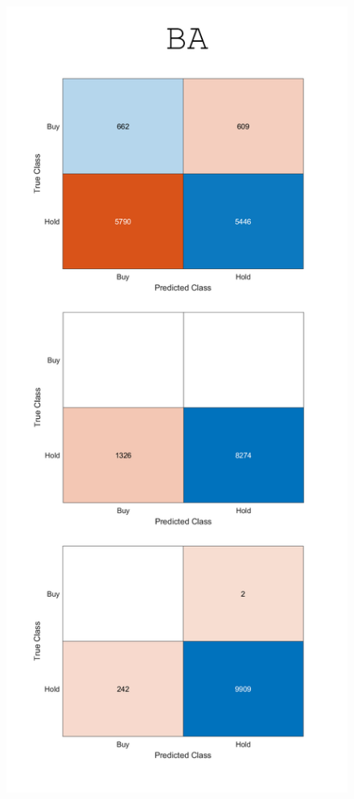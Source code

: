 \documentclass[a4paper,oneside,onecolumn,12pt]{book}
\begin{document}
\begin{figure}[H]
\begin{center}
	\includegraphics[height=0.8\textheight, keepaspectratio]{kep/BA2.png}
\end{center}
\end{figure}
\end{document}
